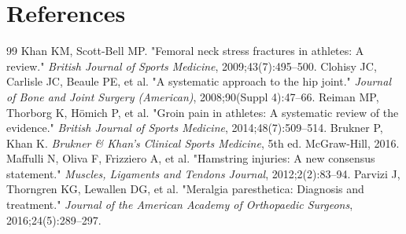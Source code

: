 \section*{References}
\begin{thebibliography}{99}
 Khan KM, Scott-Bell MP. "Femoral neck stress fractures in athletes: A review." \textit{British Journal of Sports Medicine}, 2009;43(7):495--500.
 Clohisy JC, Carlisle JC, Beaule PE, et al. "A systematic approach to the hip joint." \textit{Journal of Bone and Joint Surgery (American)}, 2008;90(Suppl 4):47--66.
 Reiman MP, Thorborg K, H\"{o}mich P, et al. "Groin pain in athletes: A systematic review of the evidence." \textit{British Journal of Sports Medicine}, 2014;48(7):509--514.
 Brukner P, Khan K. \textit{Brukner \& Khan's Clinical Sports Medicine}, 5th ed. McGraw-Hill, 2016.
 Maffulli N, Oliva F, Frizziero A, et al. "Hamstring injuries: A new consensus statement." \textit{Muscles, Ligaments and Tendons Journal}, 2012;2(2):83--94.
 Parvizi J, Thorngren KG, Lewallen DG, et al. "Meralgia paresthetica: Diagnosis and treatment." \textit{Journal of the American Academy of Orthopaedic Surgeons}, 2016;24(5):289--297.
\end{thebibliography}
